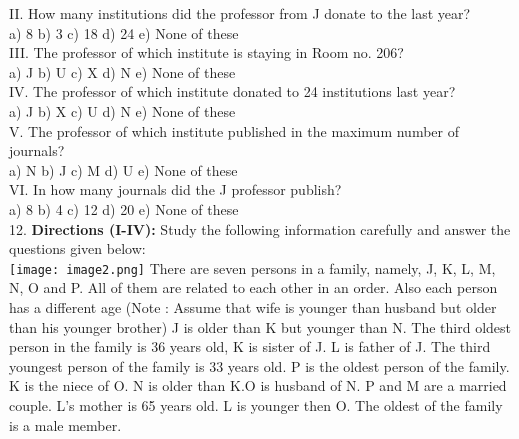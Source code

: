 \documentclass[
]{article}
\begin{document}
II. How many institutions did the professor from J donate to the last year?\\
a) 8 \hspace{2mm}b) 3 \hspace{2mm}c) 18 \hspace{2mm}d) 24 \hspace{2mm}e) None of these\\

III. The professor of which institute is staying in Room no. 206?\\
a) J \hspace{2mm}b) U \hspace{2mm}c) X \hspace{2mm}d) N \hspace{2mm}e) None of these\\

IV. The professor of which institute donated to 24 institutions last year?\\
a) J \hspace{2mm}b) X \hspace{2mm}c) U \hspace{2mm}d) N \hspace{2mm}e) None of these\\

V. The professor of which institute published in the maximum number of journals?\\
a) N \hspace{2mm}b) J \hspace{2mm}c) M \hspace{2mm}d) U \hspace{2mm}e) None of these\\

VI. In how many journals did the J professor publish?\\
a) 8 \hspace{2mm}b) 4 \hspace{2mm}c) 12 \hspace{2mm}d) 20 \hspace{2mm}e) None of these\\

12. \textbf{Directions (I-IV):} Study the following information carefully and answer the questions given
below:\\
\texttt{[image: image2.png]}
There are seven persons in a family, namely, J, K, L, M, N, O and P. All of them are related
to each other in an order. Also each person has a different age
(Note : Assume that wife is younger than husband but older than his younger brother)
J is older than K but younger than N. The third oldest person in the family is 36 years old, K
is sister of J. L is father of J. The third youngest person of the family is 33 years old. P is the
oldest person of the family. K is the niece of O. N is older than K.O is husband of N. P and
M are a married couple. L’s mother is 65 years old. L is younger then O. The oldest of the
family is a male member.\\
\end{document}
